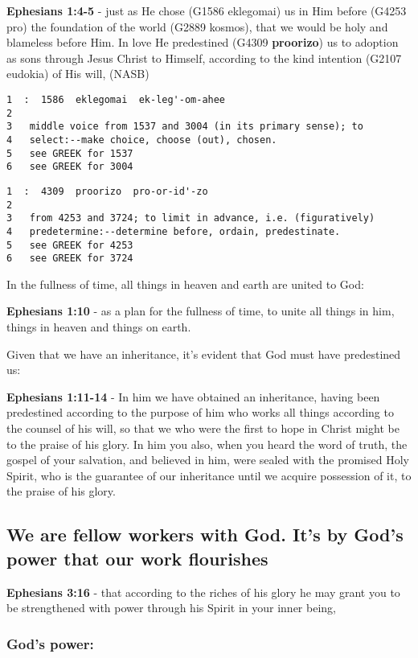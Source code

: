\documentclass[11pt]{article}
\begin{document}
\textbf{Ephesians 1:4-5} - just as He chose (G1586 eklegomai) us in Him before (G4253 pro) the foundation of the world (G2889 kosmos), that we would be holy and blameless before Him. In love He predestined (G4309 \textbf{proorizo}) us to adoption as sons through Jesus Christ to Himself, according to the kind intention (G2107 eudokia) of His will, (NASB)

\begin{verbatim}
1  :  1586  eklegomai  ek-leg'-om-ahee
2  
3   middle voice from 1537 and 3004 (in its primary sense); to
4   select:--make choice, choose (out), chosen.
5   see GREEK for 1537
6   see GREEK for 3004
\end{verbatim}

\begin{verbatim}
1  :  4309  proorizo  pro-or-id'-zo
2  
3   from 4253 and 3724; to limit in advance, i.e. (figuratively)
4   predetermine:--determine before, ordain, predestinate.
5   see GREEK for 4253
6   see GREEK for 3724
\end{verbatim}

In the fullness of time, all things in heaven and earth are united to God:

\textbf{Ephesians 1:10} - as a plan for the fullness of time, to unite all things in him, things in heaven and things on earth.

Given that we have an inheritance, it's evident that God must have predestined us:

\textbf{Ephesians 1:11-14} - In him we have obtained an inheritance, having been predestined according to the purpose of him who works all things according to the counsel of his will, so that we who were the first to hope in Christ might be to the praise of his glory. In him you also, when you heard the word of truth, the gospel of your salvation, and believed in him, were sealed with the promised Holy Spirit, who is the guarantee of our inheritance until we acquire possession of it, to the praise of his glory.

\subsection{We are fellow workers with God. It's by God's power that our work flourishes}
\label{sec:org5607168}
\textbf{Ephesians 3:16} - that according to the riches of his glory he may grant you to be strengthened with power through his Spirit in your inner being,

\subsubsection{God's power:}
\label{sec:orgd30b514}
\end{document}
